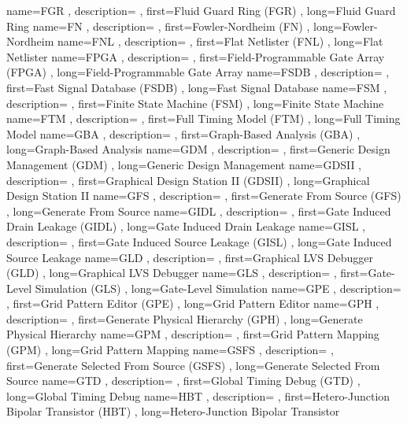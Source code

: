 { name={FGR}
, description={}
, first={Fluid Guard Ring (FGR)}
, long={Fluid Guard Ring}
}
{ name={FN}
, description={}
, first={Fowler-Nordheim (FN)}
, long={Fowler-Nordheim}
}
{ name={FNL}
, description={}
, first={Flat Netlister (FNL)}
, long={Flat Netlister}
}
{ name={FPGA}
, description={}
, first={Field-Programmable Gate Array (FPGA)}
, long={Field-Programmable Gate Array}
}
{ name={FSDB}
, description={}
, first={Fast Signal Database (FSDB)}
, long={Fast Signal Database}
}
{ name={FSM}
, description={}
, first={Finite State Machine (FSM)}
, long={Finite State Machine}
}
{ name={FTM}
, description={}
, first={Full Timing Model (FTM)}
, long={Full Timing Model}
}
{ name={GBA}
, description={}
, first={Graph-Based Analysis (GBA)}
, long={Graph-Based Analysis}
}
{ name={GDM}
, description={}
, first={Generic Design Management (GDM)}
, long={Generic Design Management}
}
{ name={GDSII}
, description={}
, first={Graphical Design Station II (GDSII)}
, long={Graphical Design Station II}
}
{ name={GFS}
, description={}
, first={Generate From Source (GFS)}
, long={Generate From Source}
}
{ name={GIDL}
, description={}
, first={Gate Induced Drain Leakage (GIDL)}
, long={Gate Induced Drain Leakage}
}
{ name={GISL}
, description={}
, first={Gate Induced Source Leakage (GISL)}
, long={Gate Induced Source Leakage}
}
{ name={GLD}
, description={}
, first={Graphical LVS Debugger (GLD)}
, long={Graphical LVS Debugger}
}
{ name={GLS}
, description={}
, first={Gate-Level Simulation (GLS)}
, long={Gate-Level Simulation}
}
{ name={GPE}
, description={}
, first={Grid Pattern Editor (GPE)}
, long={Grid Pattern Editor}
}
{ name={GPH}
, description={}
, first={Generate Physical Hierarchy (GPH)}
, long={Generate Physical Hierarchy}
}
{ name={GPM}
, description={}
, first={Grid Pattern Mapping (GPM)}
, long={Grid Pattern Mapping}
}
{ name={GSFS}
, description={}
, first={Generate Selected From Source (GSFS)}
, long={Generate Selected From Source}
}
{ name={GTD}
, description={}
, first={Global Timing Debug (GTD)}
, long={Global Timing Debug}
}
{ name={HBT}
, description={}
, first={Hetero-Junction Bipolar Transistor (HBT)}
, long={Hetero-Junction Bipolar Transistor}
}
